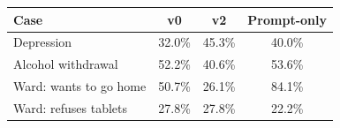 \begin{tabularx}{\linewidth}{@{}Yccc@{}}
\toprule
Case & v0 & v2 & Prompt-only\\
\midrule
Depression & 32.0\% & 45.3\% & 40.0\%\\
Alcohol withdrawal & 52.2\% & 40.6\% & 53.6\%\\
Ward: wants to go home & 50.7\% & 26.1\% & 84.1\%\\
Ward: refuses tablets & 27.8\% & 27.8\% & 22.2\%\\
\bottomrule
\end{tabularx}
